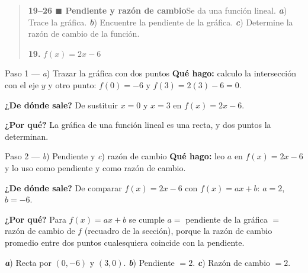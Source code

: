 \documentclass[11pt]{article}
\begin{document}
\begin{quote}
\textbf{19--26 $\blacksquare$ Pendiente y razón de cambio}\quad Se da una función lineal. \textbf{\textit{a}}) Trace la gráfica. \textbf{\textit{b}}) Encuentre la pendiente de la gráfica. \textbf{\textit{c}}) Determine la razón de cambio de la función.

\textbf{19.} $f(x)=2x-6$
\end{quote}

\begin{paso}{Paso 1 --- \textit{a}) Trazar la gráfica con dos puntos}
\textbf{Qué hago:} calculo la intersección con el eje $y$ y otro punto: $f(0)=-6$ y $f(3)=2(3)-6=0$.

\textbf{¿De dónde sale?} De sustituir $x=0$ y $x=3$ en $f(x)=2x-6$.

\textbf{¿Por qué?} La gráfica de una función lineal es una recta, y dos puntos la determinan.
\begin{center}
\end{center}
\end{paso}

\begin{paso}{Paso 2 --- \textit{b}) Pendiente y \textit{c}) razón de cambio}
\textbf{Qué hago:} leo $a$ en $f(x)=2x-6$ y lo uso como pendiente y como razón de cambio.

\textbf{¿De dónde sale?} De comparar $f(x)=2x-6$ con $f(x)=ax+b$: $a=2$, $b=-6$.

\textbf{¿Por qué?} Para $f(x)=ax+b$ se cumple $a=$ pendiente de la gráfica $=$ razón de cambio de $f$ (recuadro de la sección), porque la razón de cambio promedio entre dos puntos cualesquiera coincide con la pendiente.
\end{paso}

\begin{resp}
\textbf{\textit{a}}) Recta por $(0,-6)$ y $(3,0)$. \quad \textbf{\textit{b}}) Pendiente $=2$. \quad \textbf{\textit{c}}) Razón de cambio $=2$.
\end{resp}
\end{document}

